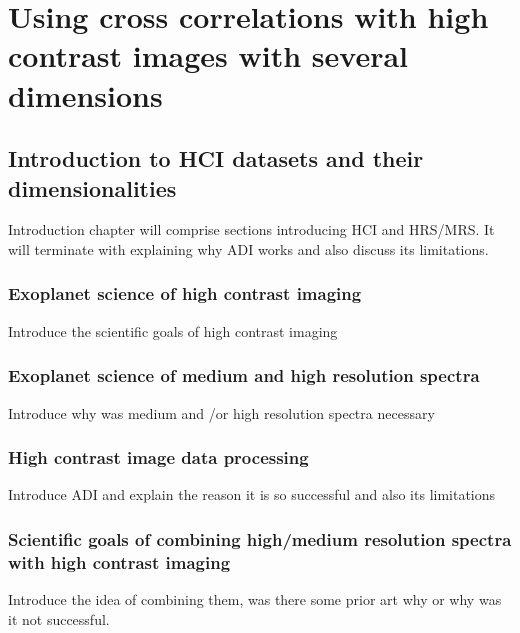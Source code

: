 \part{Using cross correlations with high contrast images with several dimensions}
\startcontents[chapters]
\printmyminitoc{
}



\chapter{Introduction to HCI datasets and their dimensionalities}
Introduction chapter will comprise sections introducing HCI and HRS/MRS. 
It will terminate with explaining why ADI works and also discuss its limitations.
\section{Exoplanet science of high contrast imaging}
Introduce the scientific goals of high contrast imaging
\section{Exoplanet science of medium and high resolution spectra }
Introduce why was medium and /or high resolution spectra necessary
\section{High contrast image data processing}
Introduce ADI and explain the reason it is so successful and also its limitations
\section{Scientific goals of combining high/medium resolution spectra with high contrast imaging}
Introduce the idea of combining them, was there some prior art why or why was it not successful.
